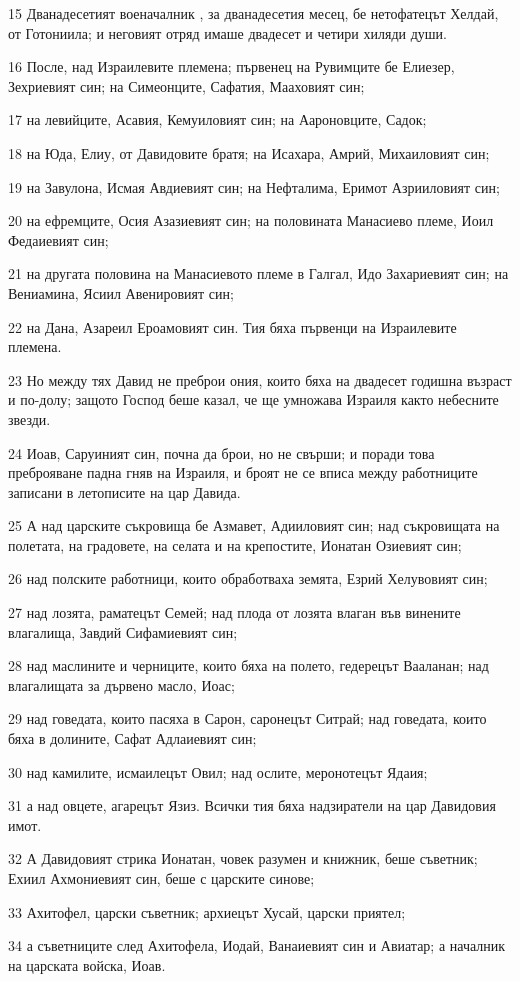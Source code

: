 \par 15 Дванадесетият военачалник , за дванадесетия месец, бе нетофатецът Хелдай, от Готониила; и неговият отряд имаше двадесет и четири хиляди души.
\par 16 После, над Израилевите племена; първенец на Рувимците бе Елиезер, Зехриевият син; на Симеонците, Сафатия, Мааховият син;
\par 17 на левийците, Асавия, Кемуиловият син; на Аароновците, Садок;
\par 18 на Юда, Елиу, от Давидовите братя; на Исахара, Амрий, Михаиловият син;
\par 19 на Завулона, Исмая Авдиевият син; на Нефталима, Еримот Азрииловият син;
\par 20 на ефремците, Осия Азазиевият син; на половината Манасиево племе, Иоил Федаиевият син;
\par 21 на другата половина на Манасиевото племе в Галгал, Идо Захариевият син; на Вениамина, Ясиил Авенировият син;
\par 22 на Дана, Азареил Ероамовият син. Тия бяха първенци на Израилевите племена.
\par 23 Но между тях Давид не преброи ония, които бяха на двадесет годишна възраст и по-долу; защото Господ беше казал, че ще умножава Израиля както небесните звезди.
\par 24 Иоав, Саруиният син, почна да брои, но не свърши; и поради това преброяване падна гняв на Израиля, и броят не се вписа между работниците записани в летописите на цар Давида.
\par 25 А над царските съкровища бе Азмавет, Адииловият син; над съкровищата на полетата, на градовете, на селата и на крепостите, Ионатан Озиевият син;
\par 26 над полските работници, които обработваха земята, Езрий Хелувовият син;
\par 27 над лозята, раматецът Семей; над плода от лозята влаган във винените влагалища, Завдий Сифамиевият син;
\par 28 над маслините и черниците, които бяха на полето, гедерецът Вааланан; над влагалищата за дървено масло, Иоас;
\par 29 над говедата, които пасяха в Сарон, саронецът Ситрай; над говедата, които бяха в долините, Сафат Адлаиевият син;
\par 30 над камилите, исмаилецът Овил; над ослите, меронотецът Ядаия;
\par 31 а над овцете, агарецът Язиз. Всички тия бяха надзиратели на цар Давидовия имот.
\par 32 А Давидовият стрика Ионатан, човек разумен и книжник, беше съветник; Ехиил Ахмониевият син, беше с царските синове;
\par 33 Ахитофел, царски съветник; архиецът Хусай, царски приятел;
\par 34 а съветниците след Ахитофела, Иодай, Ванаиевият син и Авиатар; а началник на царската войска, Иоав.

